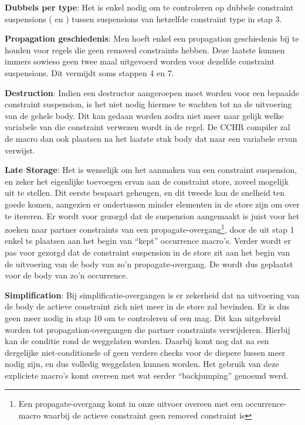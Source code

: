 {\bf Dubbels per type}: Het is enkel nodig om te controleren op dubbele constraint suspensions ( en ) tussen suspensions van hetzelfde constraint type in stap 3.

{\bf Propagation geschiedenis}: Men hoeft enkel een propagation geschiedenis bij te houden voor regels die geen removed constraints hebben. Deze laatste kunnen immers sowieso geen twee maal uitgevoerd worden voor dezelfde constraint suspensions. Dit vermijdt soms stappen 4 en 7.

{\bf Destruction}: Indien een destructor aangeroepen moet worden voor een bepaalde constraint suspension, is het niet nodig hiermee te wachten tot na de uitvoering van de gehele body. Dit kan gedaan worden zodra niet meer naar gelijk welke variabele van die constraint verwezen wordt in de regel. De CCHR compiler zal de  macro dan ook plaatsen na het laatste stuk body dat naar een variabele ervan verwijst.

{\bf Late Storage}: Het is wenselijk om het aanmaken van een constraint suspension, en zeker het eigenlijke toevoegen ervan aan de constraint store, zoveel mogelijk uit te stellen. Dit eerste bespaart geheugen, en dit tweede kan de snelheid ten goede komen, aangezien er ondertussen minder elementen in de store zijn om over te itereren. Er wordt voor gezorgd dat de suspension aangemaakt is juist voor het zoeken naar partner constraints van een propagate-overgang\footnote{Een propagate-overgang komt in onze uitvoer overeen met een occurrence-macro waarbij de actieve constraint geen removed constraint is}, door de  uit stap 1 enkel te plaatsen aan het begin van ``kept'' occurrence macro's. Verder wordt er pas voor gezorgd dat de constraint suspension in de store zit aan het begin van de uitvoering van de body van zo'n propagate-overgang. De  wordt dus geplaatst voor de body van zo'n occurrence.

{\bf Simplification}: Bij simplificatie-overgangen is er zekerheid dat na uitvoering van de body de actieve constraint zich niet meer in de store zal bevinden. Er is dus geen  meer nodig in stap 10 om te controleren of een  mag. Dit kan uitgebreid worden tot propagation-overgangen die partner constraints verwijderen. Hierbij kan de  conditie rond de  weggelaten worden. Daarbij komt nog dat na een dergelijke niet-conditionele  of  geen verdere checks voor de diepere lussen meer nodig zijn, en dus volledig weggelaten kunnen worden. Het gebruik van deze expliciete  macro's komt overeen met wat eerder ``backjumping'' genoemd werd.

